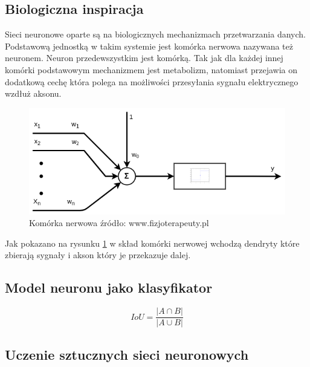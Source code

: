 \documentclass{article}
\begin{document}
\subsection{Biologiczna inspiracja}
Sieci neuronowe oparte są na biologicznych mechanizmach przetwarzania danych. Podstawową jednostką
w takim systemie jest komórka nerwowa \cite{Tadeusiewicz1994} nazywana też neuronem.
Neuron przedewszystkim jest komórką. Tak jak dla każdej innej komórki podstawowym mechanizmem jest
metabolizm, natomiast przejawia on dodatkową cechę która polega na możliwości przesyłania sygnału
elektrycznego wzdłuż aksonu.
\begin{figure}[htb] 
	\label{fig:neuron}
	\centering
	\includegraphics[width=\textwidth]{figures/neuron}
	\caption{Komórka nerwowa \tiny{źródło: www.fizjoterapeuty.pl}}
\end{figure}
Jak pokazano na rysunku \ref{fig:neuron} w skład komórki nerwowej wchodzą dendryty które zbierają
sygnały i akson który je przekazuje dalej.

\FloatBarrier
\subsection{Model neuronu jako klasyfikator}

\begin{equation}
	\label{equ:two_point_loc}
	IoU = \frac{|A \cap B|}{|A \cup B|}
\end{equation}
\subsection{Uczenie sztucznych sieci neuronowych}

\end{document}

